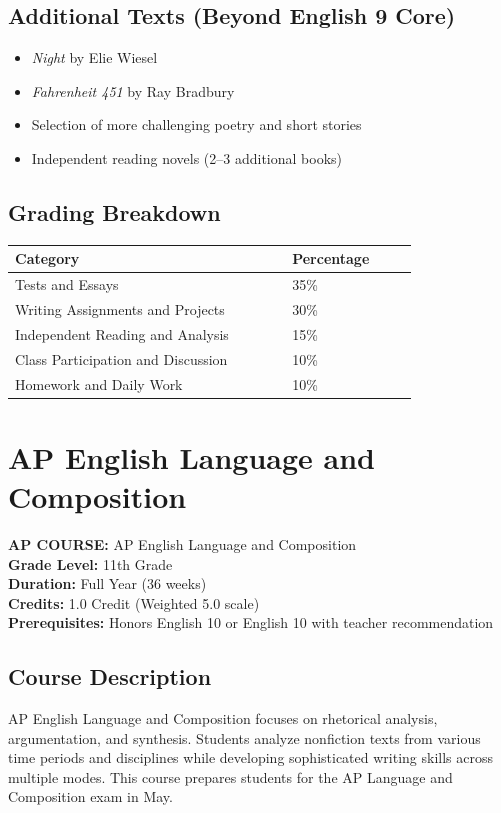 \documentclass[12pt,oneside]{book}
\begin{document}
\section{Additional Texts (Beyond English 9 Core)}
\begin{itemize}[leftmargin=2em]
    \item \emph{Night} by Elie Wiesel
    \item \emph{Fahrenheit 451} by Ray Bradbury
    \item Selection of more challenging poetry and short stories
    \item Independent reading novels (2--3 additional books)
\end{itemize}

\section{Grading Breakdown}
\begin{center}
\begin{tabular}{L{0.55\linewidth}L{0.25\linewidth}}
\toprule
\textbf{Category} & \textbf{Percentage} \\
\midrule
Tests and Essays & 35\% \\
Writing Assignments and Projects & 30\% \\
Independent Reading and Analysis & 15\% \\
Class Participation and Discussion & 10\% \\
Homework and Daily Work & 10\% \\
\bottomrule
\end{tabular}
\end{center}

\chapter{AP English Language and Composition}

\noindent\textbf{AP COURSE:} AP English Language and Composition\\
\textbf{Grade Level:} 11th Grade\\
\textbf{Duration:} Full Year (36 weeks)\\
\textbf{Credits:} 1.0 Credit (Weighted 5.0 scale)\\
\textbf{Prerequisites:} Honors English 10 or English 10 with teacher recommendation

\section{Course Description}
AP English Language and Composition focuses on rhetorical analysis, argumentation, and synthesis.
Students analyze nonfiction texts from various time periods and disciplines while developing sophisticated
writing skills across multiple modes. This course prepares students for the AP Language and Composition
exam in May.
\end{document}
